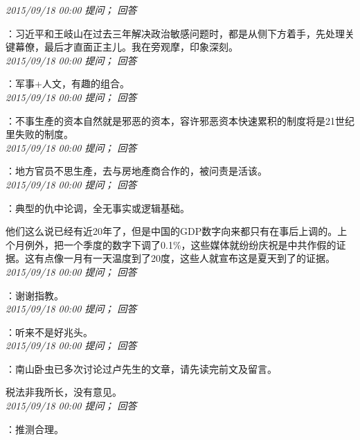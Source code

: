\documentclass[twocolumn]{ctexart}
\begin{document}
\textit{\hfill\noindent\small 2015/09/18 00:00 提问； 回答}

：习近平和王岐山在过去三年解决政治敏感问题时，都是从侧下方着手，先处理关键幕僚，最后才直面正主儿。我在旁观摩，印象深刻。\\

\textit{\hfill\noindent\small 2015/09/18 00:00 提问； 回答}

：军事+人文，有趣的组合。\\

\textit{\hfill\noindent\small 2015/09/18 00:00 提问； 回答}

：不事生產的资本自然就是邪恶的资本，容许邪恶资本快速累积的制度将是21世纪里失败的制度。\\

\textit{\hfill\noindent\small 2015/09/18 00:00 提问； 回答}

：地方官员不思生產，去与房地產商合作的，被问责是活该。\\

\textit{\hfill\noindent\small 2015/09/18 00:00 提问； 回答}

：典型的仇中论调，全无事实或逻辑基础。

他们这么说已经有近20年了，但是中国的GDP数字向来都只有在事后上调的。上个月例外，把一个季度的数字下调了0.1\%，这些媒体就纷纷庆祝是中共作假的证据。这有点像一月有一天温度到了20度，这些人就宣布这是夏天到了的证据。\\

\textit{\hfill\noindent\small 2015/09/18 00:00 提问； 回答}

：谢谢指教。\\

\textit{\hfill\noindent\small 2015/09/18 00:00 提问； 回答}

：听来不是好兆头。\\

\textit{\hfill\noindent\small 2015/09/18 00:00 提问； 回答}

：南山卧虫已多次讨论过卢先生的文章，请先读完前文及留言。

税法非我所长，没有意见。\\

\textit{\hfill\noindent\small 2015/09/18 00:00 提问； 回答}

：推测合理。\\
\end{document}
